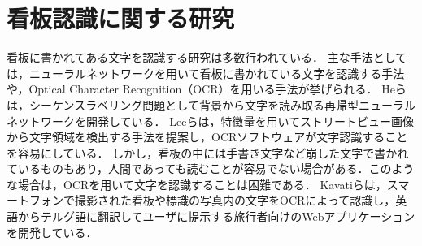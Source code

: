 \section{看板認識に関する研究}
  看板に書かれてある文字を認識する研究は多数行われている．
  主な手法としては，ニューラルネットワークを用いて看板に書かれている文字を認識する手法や，Optical Character Recognition（OCR）を用いる手法が挙げられる．
  Heらは，シーケンスラベリング問題として背景から文字を読み取る再帰型ニューラルネットワークを開発している\cite{He:2016}．
  Leeらは，特徴量を用いてストリートビュー画像から文字領域を検出する手法を提案し，OCRソフトウェアが文字認識することを容易にしている\cite{Lee:2016}．
  しかし，看板の中には手書き文字など崩した文字で書かれているものもあり，人間であっても読むことが容易でない場合がある．このような場合は，OCRを用いて文字を認識することは困難である．
  Kavatiらは，スマートフォンで撮影された看板や標識の写真内の文字をOCRによって認識し，英語からテルグ語に翻訳してユーザに提示する旅行者向けのWebアプリケーションを開発している\cite{Kavati:2017}．
  